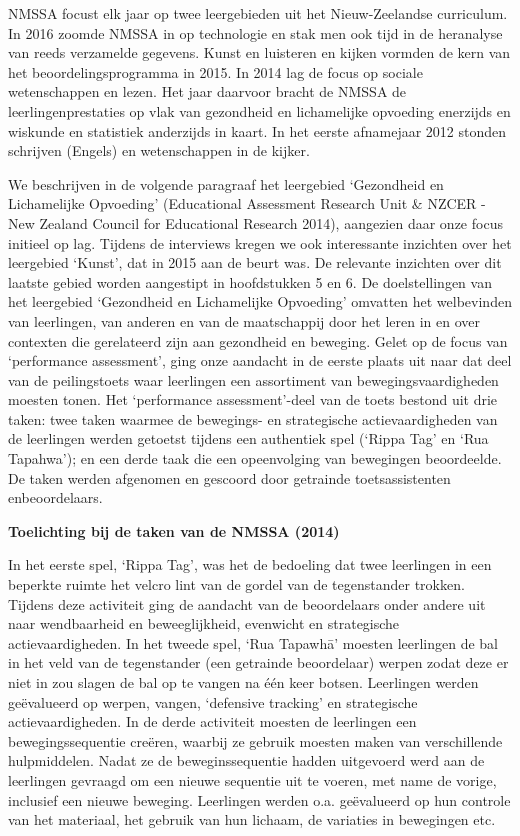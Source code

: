 \documentclass[
  letterpaper,
]{report}
\begin{document}
NMSSA focust elk jaar op twee leergebieden uit het Nieuw-Zeelandse
curriculum. In 2016 zoomde NMSSA in op technologie en stak men ook tijd
in de heranalyse van reeds verzamelde gegevens. Kunst en luisteren en
kijken vormden de kern van het beoordelingsprogramma in 2015. In 2014
lag de focus op sociale wetenschappen en lezen. Het jaar daarvoor bracht
de NMSSA de leerlingenprestaties op vlak van gezondheid en lichamelijke
opvoeding enerzijds en wiskunde en statistiek anderzijds in kaart. In
het eerste afnamejaar 2012 stonden schrijven (Engels) en wetenschappen
in de kijker.

We beschrijven in de volgende paragraaf het leergebied `Gezondheid en
Lichamelijke Opvoeding' (Educational Assessment Research Unit \& NZCER -
New Zealand Council for Educational Research 2014), aangezien daar onze
focus initieel op lag. Tijdens de interviews kregen we ook interessante
inzichten over het leergebied `Kunst', dat in 2015 aan de beurt was. De
relevante inzichten over dit laatste gebied worden aangestipt in
hoofdstukken 5 en 6. De doelstellingen van het leergebied `Gezondheid en
Lichamelijke Opvoeding' omvatten het welbevinden van leerlingen, van
anderen en van de maatschappij door het leren in en over contexten die
gerelateerd zijn aan gezondheid en beweging. Gelet op de focus van
`performance assessment', ging onze aandacht in de eerste plaats uit
naar dat deel van de peilingstoets waar leerlingen een assortiment van
bewegingsvaardigheden moesten tonen. Het `performance assessment'-deel
van de toets bestond uit drie taken: twee taken waarmee de bewegings- en
strategische actievaardigheden van de leerlingen werden getoetst tijdens
een authentiek spel (`Rippa Tag' en `Rua Tapahwa'); en een derde taak
die een opeenvolging van bewegingen beoordeelde. De taken werden
afgenomen en gescoord door getrainde toetsassistenten enbeoordelaars.

\textbf{Toelichting bij de taken van de NMSSA (2014)}

In het eerste spel, `Rippa Tag', was het de bedoeling dat twee
leerlingen in een beperkte ruimte het velcro lint van de gordel van de
tegenstander trokken. Tijdens deze activiteit ging de aandacht van de
beoordelaars onder andere uit naar wendbaarheid en beweeglijkheid,
evenwicht en strategische actievaardigheden. In het tweede spel, `Rua
Tapawhā' moesten leerlingen de bal in het veld van de tegenstander (een
getrainde beoordelaar) werpen zodat deze er niet in zou slagen de bal op
te vangen na één keer botsen. Leerlingen werden geëvalueerd op werpen,
vangen, `defensive tracking' en strategische actievaardigheden. In de
derde activiteit moesten de leerlingen een bewegingssequentie creëren,
waarbij ze gebruik moesten maken van verschillende hulpmiddelen. Nadat
ze de beweginssequentie hadden uitgevoerd werd aan de leerlingen
gevraagd om een nieuwe sequentie uit te voeren, met name de vorige,
inclusief een nieuwe beweging. Leerlingen werden o.a. geëvalueerd op hun
controle van het materiaal, het gebruik van hun lichaam, de variaties in
bewegingen etc.
\end{document}
